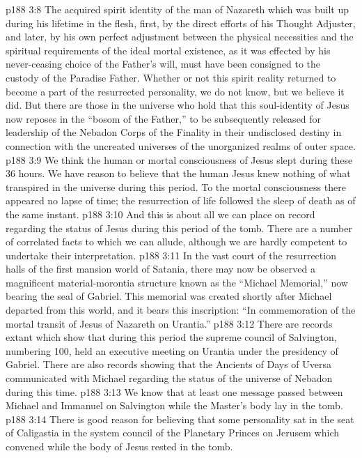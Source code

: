 \vs p188 3:8 \bibnobreakspace The acquired spirit identity of the man of Nazareth which was built up during his lifetime in the flesh, first, by the direct efforts of his Thought Adjuster, and later, by his own perfect adjustment between the physical necessities and the spiritual requirements of the ideal mortal existence, as it was effected by his never\hyp{}ceasing choice of the Father’s will, must have been consigned to the custody of the Paradise Father. Whether or not this spirit reality returned to become a part of the resurrected personality, we do not know, but we believe it did. But there are those in the universe who hold that this soul\hyp{}identity of Jesus now reposes in the “bosom of the Father,” to be subsequently released for leadership of the Nebadon Corps of the Finality in their undisclosed destiny in connection with the uncreated universes of the unorganized realms of outer space.
\vs p188 3:9 \bibnobreakspace We think the human or mortal consciousness of Jesus slept during these 36 hours. We have reason to believe that the human Jesus knew nothing of what transpired in the universe during this period. To the mortal consciousness there appeared no lapse of time; the resurrection of life followed the sleep of death as of the same instant.
\vs p188 3:10 \pc And this is about all we can place on record regarding the status of Jesus during this period of the tomb. There are a number of correlated facts to which we can allude, although we are hardly competent to undertake their interpretation.
\vs p188 3:11 In the vast court of the resurrection halls of the first mansion world of Satania, there may now be observed a magnificent material\hyp{}morontia structure known as the “Michael Memorial,” now bearing the seal of Gabriel. This memorial was created shortly after Michael departed from this world, and it bears this inscription: “In commemoration of the mortal transit of Jesus of Nazareth on Urantia.”
\vs p188 3:12 There are records extant which show that during this period the supreme council of Salvington, numbering 100, held an executive meeting on Urantia under the presidency of Gabriel. There are also records showing that the Ancients of Days of Uversa communicated with Michael regarding the status of the universe of Nebadon during this time.
\vs p188 3:13 We know that at least one message passed between Michael and Immanuel on Salvington while the Master’s body lay in the tomb.
\vs p188 3:14 There is good reason for believing that some personality sat in the seat of Caligastia in the system council of the Planetary Princes on Jerusem which convened while the body of Jesus rested in the tomb.
